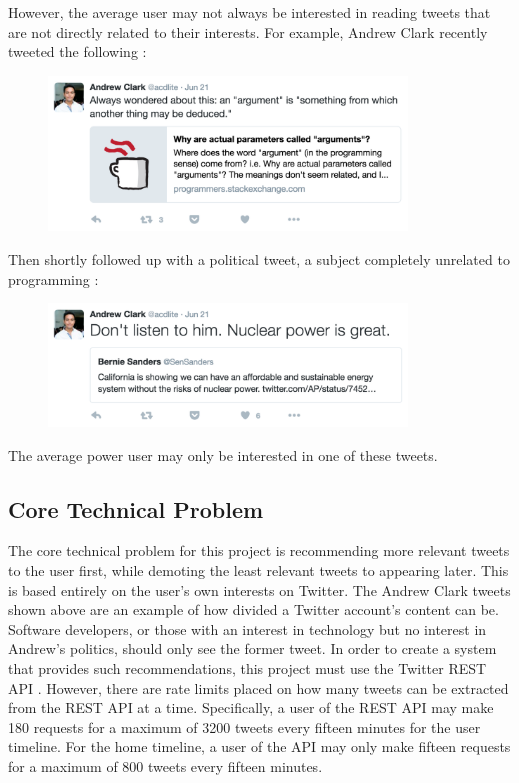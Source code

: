 \documentclass{article}
\begin{document}
However, the average user may not always be interested in reading tweets that are not directly related to their interests. For example, Andrew Clark recently tweeted the following \cite{clark1}:

\begin{figure}[H]
    \includegraphics[width=0.85\textwidth, center]{clark11}
\end{figure}

\noindent Then shortly followed up with a political tweet, a subject completely unrelated to programming \cite{clark2}:

\begin{figure}[H]
    \includegraphics[width=0.85\textwidth, center]{clark22}
\end{figure}

\noindent The average power user may only be interested in one of these tweets.


\newpage


\subsection{Core Technical Problem} %
The core technical problem for this project is recommending more relevant tweets to the user first, while demoting the least relevant tweets to appearing later. This is based entirely on the user's own interests on Twitter. The Andrew Clark tweets shown above are an example of how divided a Twitter account's content can be. Software developers, or those with an interest in technology but no interest in Andrew's politics, should only see the former tweet.
In order to create a system that provides such recommendations, this project must use the Twitter REST API \cite{twitter-rest-api}. However, there are rate limits placed on how many tweets can be extracted from the REST API at a time. Specifically, a user of the REST API may make 180 requests for a maximum of 3200 tweets every fifteen minutes for the user timeline. For the home timeline, a user of the API may only make fifteen requests for a maximum of 800 tweets every fifteen minutes. 
\end{document}
